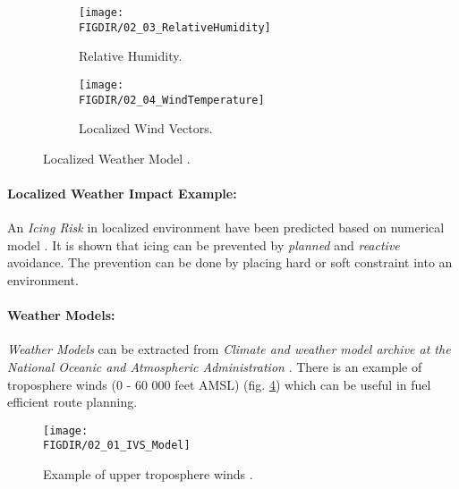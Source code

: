 \begin{figure}[H]
	\centering
	\begin{subfigure}{0.45\textwidth}
		\texttt{[image: \\FIGDIR/02\_03\_RelativeHumidity]}
		\caption{Relative Humidity.} 
		\label{fig:humidityRelativeLocalizedExample}
	\end{subfigure}
	\vspace{1em} 
	\begin{subfigure}{0.45\textwidth} %
		\texttt{[image: \\FIGDIR/02\_04\_WindTemperature]}
		\caption{Localized Wind Vectors.} %
		\label{fig:localizedWindVectorsExample}
	\end{subfigure}
	\caption{Localized Weather Model \cite{balaban2017dynamic}.} %
	\label{fig:localizedWeatherModelExample}
\end{figure}
    
\paragraph{Localized Weather Impact Example:} An \emph{Icing Risk} in localized environment have been predicted based on numerical model \cite{thompson2017numerical}. It is shown that icing can be prevented by \emph{planned} and \emph{reactive} avoidance. The prevention can be done by placing hard or soft constraint into an environment. 

    
\paragraph{Weather Models:} \emph{Weather Models} can be extracted from \emph{Climate and weather model archive at the National Oceanic and Atmospheric Administration} \cite{rutledge2006nomads}. There is an example of troposphere winds (0 - 60 000 feet AMSL) (fig. \ref{fig:ExampleOfTroposphereWinds}) which can be useful in fuel efficient route planning. 
    
\begin{figure}[H]
    \centering
    \texttt{[image: \\FIGDIR/02\_01\_IVS\_Model]}
    \caption{Example of upper troposphere winds \cite{rutledge2006nomads}.}
    \label{fig:ExampleOfTroposphereWinds}
\end{figure}